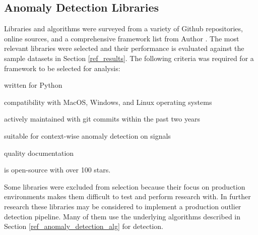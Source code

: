 




\subsection{Anomaly Detection Libraries}
\label{ref_code_libraries}
 Libraries and algorithms were surveyed from a variety of Github repositories, online sources, and a comprehensive framework list from Author \cite{medico2020-ts-list}. The most relevant libraries were selected and their performance is evaluated against the sample datasets in Section \ref{ref_results}. The following criteria was required for a framework to be selected for analysis:
 \begin{inlinelist}
     \item written for Python
     \item compatibility with MacOS, Windows, and Linux operating systems
     \item actively maintained with git commits within the past two years
     \item suitable for context-wise anomaly detection on signals
     \item quality documentation
     \item is open-source with over 100 stars.
 \end{inlinelist}


Some libraries were excluded from selection because their focus on production environments makes them difficult to test and perform research with. In further research these libraries may be considered to implement a production outlier detection pipeline. Many of them use the underlying algorithms described in Section \ref{ref_anomaly_detection_alg} for detection.

